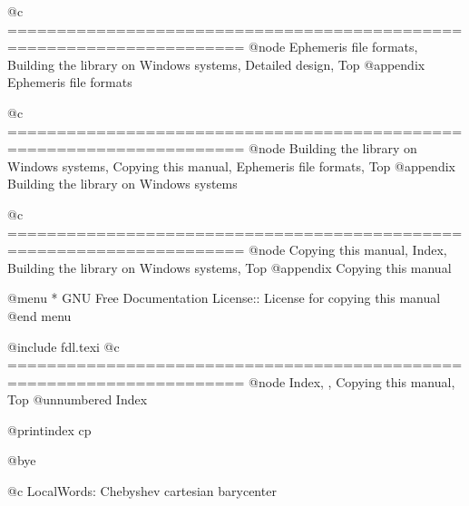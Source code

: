 @c ======================================================================
@node Ephemeris file formats, Building the library on Windows systems, Detailed design, Top
@appendix Ephemeris file formats


@c ======================================================================
@node  Building the library on Windows systems, Copying this manual, Ephemeris file formats, Top
@appendix Building the library on Windows systems


@c ======================================================================
@node Copying this manual, Index, Building the library on Windows systems, Top
@appendix Copying this manual

@menu
* GNU Free Documentation License:: License for copying this manual
@end menu

@include fdl.texi
@c ======================================================================
@node Index,  , Copying this manual, Top
@unnumbered Index

@printindex cp

@bye

@c  LocalWords:  Chebyshev cartesian barycenter
